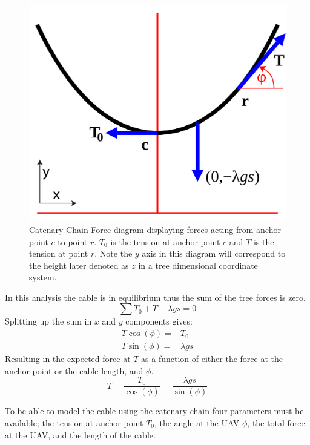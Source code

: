 \begin{figure}[hbtp]
\centering
\includegraphics[scale=0.25]{graphics/CatenaryForceDiagram.png}
\caption[Catenary Chain Force diagram]{Catenary Chain Force diagram displaying forces acting from anchor point $c$ to point $r$. $T_0$ is the tension at anchor point $c$ and $T$ is the tension at point $r$. Note the $y$ axis in this diagram will correspond to the height later denoted as $z$ in a tree dimensional coordinate system.}
\label{fig:catenary_force_diagram}
\end{figure}

\noindent
In this analysis the cable is in equilibrium thus the sum of the tree forces is zero. 
\begin{equation}
\sum T_0 + T -\lambda gs = 0
\end{equation}
Splitting up the sum in $x$ and $y$ components gives:
\begin{eqnarray}
T\cos(\phi) =& T_0 \\
T \sin(\phi) =& \lambda g s
\end{eqnarray}
Resulting in the expected force at $T$ as a function of either the force at the anchor point or the cable length, and $\phi$.
\begin{equation}
T = \frac{T_0}{\cos(\phi)} = \frac{\lambda g s}{\sin(\phi)}
\end{equation}

\noindent
To be able to model the cable using the catenary chain four parameters must be available; the tension at anchor point $T_0$, the angle at the UAV $\phi$, the total force at the UAV, and the length of the cable.\\

